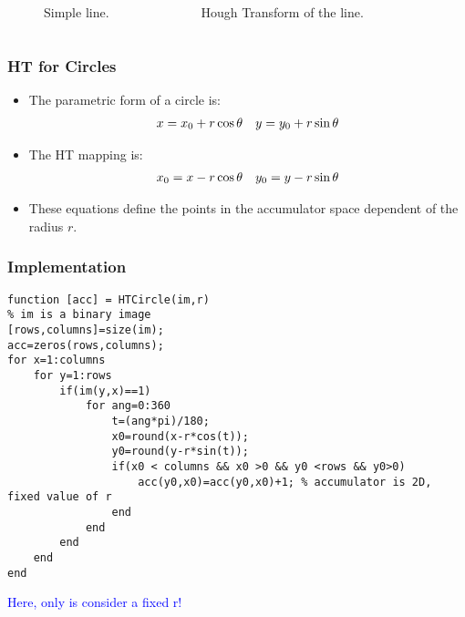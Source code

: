 \documentclass{beamer}
\begin{document}
\begin{frame}

  \begin{columns}
    \begin{figure}
      \caption{Simple line.}
      \label{fig:fakeLine}
    \end{figure}
    \begin{figure}
      \caption{Hough Transform of the line.}
      \label{fig:HTPolar}
    \end{figure}
\end{columns}
\end{frame}


\begin{frame}
  \frametitle{HT for Circles}
  \begin{itemize}
  \item The parametric form of a circle is:
    \begin{equation}
      \begin{array}{c c}
      x=x_{0}+r\cos{\theta} &y=y_{0}+r\sin{\theta}
      \end{array}
      \label{eq:circle2}
    \end{equation}

  \item The HT    mapping is:
    \begin{equation}
      \begin{array}{c c}
      x_{0}=x-r\cos{\theta} &y_{0}=y-r\sin{\theta}
      \end{array}
    \end{equation}

    \item These equations define the points in the accumulator space
      dependent of the radius $r$.
\end{itemize}
\end{frame}


\begin{frame}[fragile]
\frametitle{Implementation}
  \tiny{\begin{verbatim} 
function [acc] = HTCircle(im,r)
% im is a binary image
[rows,columns]=size(im);
acc=zeros(rows,columns);
for x=1:columns
    for y=1:rows
        if(im(y,x)==1)
            for ang=0:360
                t=(ang*pi)/180;
                x0=round(x-r*cos(t));
                y0=round(y-r*sin(t));
                if(x0 < columns && x0 >0 && y0 <rows && y0>0)
                    acc(y0,x0)=acc(y0,x0)+1; % accumulator is 2D, fixed value of r
                end
            end
        end
    end
end\end{verbatim}}
\textcolor{blue}{Here, only is consider a fixed r!}
\end{frame}
\end{document}
